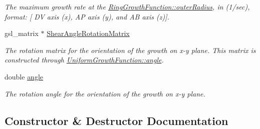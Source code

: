 \begin{DoxyCompactItemize}
\begin{DoxyCompactList}\small\item\em The maximum growth rate at the \hyperlink{classRingGrowthFunction_a8b7d5268d9d47f112b56feef58193649}{Ring\+Growth\+Function\+::outer\+Radius}, in (1/sec), format\+: \mbox{[} D\+V axis (x), A\+P axis (y), and A\+B axis (z)\mbox{]}. \end{DoxyCompactList}\item 
\hypertarget{classRingGrowthFunction_a9603e5de21f7bca0c23deff2c1e9efd6}{}gsl\+\_\+matrix $\ast$ \hyperlink{classRingGrowthFunction_a9603e5de21f7bca0c23deff2c1e9efd6}{Shear\+Angle\+Rotation\+Matrix}\label{classRingGrowthFunction_a9603e5de21f7bca0c23deff2c1e9efd6}

\begin{DoxyCompactList}\small\item\em The rotation matrix for the orientation of the growth on x-\/y plane. This matrix is constructed through \hyperlink{classUniformGrowthFunction_a1a985ff52f9796688e00942b4d3349f8}{Uniform\+Growth\+Function\+::angle}. \end{DoxyCompactList}\item 
\hypertarget{classRingGrowthFunction_add6283d1ad999925c4202a3fa66b76ea}{}double \hyperlink{classRingGrowthFunction_add6283d1ad999925c4202a3fa66b76ea}{angle}\label{classRingGrowthFunction_add6283d1ad999925c4202a3fa66b76ea}

\begin{DoxyCompactList}\small\item\em The rotation angle for the orientation of the growth on x-\/y plane. \end{DoxyCompactList}\end{DoxyCompactItemize}


\subsection{Constructor \& Destructor Documentation}
\hypertarget{classRingGrowthFunction_a2e12b527d77b74130258ad25dc18e88d}{}

